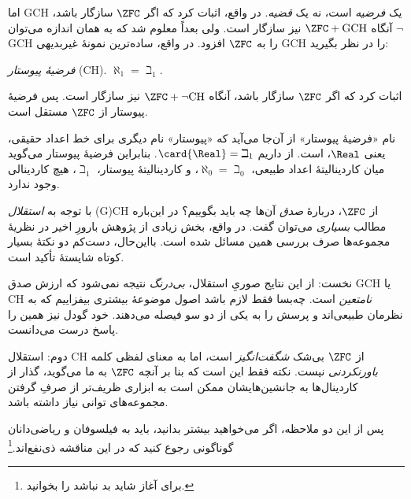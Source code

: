 \documentclass[../../../include/open-logic-section]{subfiles}
\begin{document}
اما GCH یک \emph{فرضیه} است، نه یک \emph{قضیه}. در واقع،
\citet{Godel1938} اثبات کرد که اگر $\ZFC$ سازگار باشد، آنگاه
$\ZFC + \text{GCH}$ نیز سازگار است. ولی بعداً معلوم شد که به همان اندازه
می‌توان $\lnot$GCH را به $\ZFC$ افزود. در واقع، ساده‌ترین نمونهٔ
غیربدیهی GCH را در نظر بگیرید:

\begin{defish}
\emph{فرضیهٔ پیوستار} (CH). $\aleph_1 = \beth_1$.
\end{defish}

\citet{Cohen1963} اثبات کرد که اگر $\ZFC$ سازگار باشد، آنگاه
$\ZFC + \lnot\text{CH}$ نیز سازگار است. پس فرضیهٔ پیوستار از $\ZFC$
مستقل است.

نام «فرضیهٔ پیوستار» از آن‌جا می‌آید که «پیوستار» نام دیگری برای خط
اعداد حقیقی، یعنی $\Real$، است. از 
داریم $\card{\Real} = \beth_1$. بنابراین فرضیهٔ پیوستار می‌گوید میان
کاردینالیتهٔ اعداد طبیعی، $\aleph_0 = \beth_0$، و کاردینالیتهٔ پیوستار،
$\beth_1$، هیچ کاردینالی وجود ندارد.

با توجه به \emph{استقلال} (G)CH از $\ZFC$، دربارهٔ \emph{صدق} آن‌ها چه
باید بگوییم؟ در این‌باره مطالب \emph{بسیاری} می‌توان گفت. در واقع، بخش
زیادی از پژوهش بارورِ اخیر در نظریهٔ مجموعه‌ها صرف بررسی همین مسائل شده
است. بااین‌حال، دست‌کم دو نکتهٔ بسیار کوتاه شایستهٔ تأکید است.

نخست: از این نتایج صوریِ استقلال، \emph{بی‌درنگ} نتیجه نمی‌شود که ارزش
صدق GCH یا CH \emph{نامتعین} است. چه‌بسا فقط لازم باشد اصول موضوعهٔ
بیشتری بیفزاییم که به نظرمان طبیعی‌اند و پرسش را به یکی از دو سو فیصله
می‌دهند. خود گودل نیز همین را پاسخ درست می‌دانست.

دوم: استقلال CH از $\ZFC$ بی‌شک \emph{شگفت‌انگیز} است، اما به معنای
لفظی کلمه \emph{باورنکردنی} نیست. نکته فقط این است که بنا بر آنچه
$\ZFC$ به ما می‌گوید، گذار از کاردینال‌ها به جانشین‌هایشان ممکن است به
ابزاری ظریف‌تر از صرفِ گرفتن مجموعه‌های توانی نیاز داشته باشد.

پس از این دو ملاحظه، اگر می‌خواهید بیشتر بدانید، باید به فیلسوفان و
ریاضی‌دانان گوناگونی رجوع کنید که در این مناقشه ذی‌نفع‌اند.\footnote{برای
آغاز شاید بد نباشد \citet[\S15.6]{Potter2004} را بخوانید.}
\end{document}
